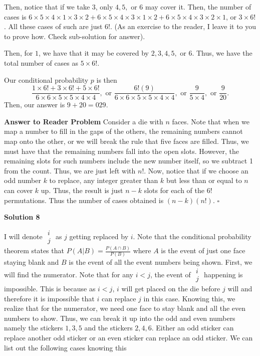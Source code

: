 \begin{enumerate}
 Then, notice that if we take \( 3 \), only \( 4, 5, \) or \( 6 \) may cover it. Then, the number of cases is \( 6 \times 5 \times 4 \times 1 \times 3 \times 2 + 6 \times 5 \times 4 \times 3 \times 1 \times 2 + 6 \times 5 \times 4 \times 3 \times 2 \times 1 \), or \( 3 \times 6! \). All these cases of such are just \( 6! \). (As an exercise to the reader, I leave it to you to prove how. Check sub-solution for answer).

 Then, for \( 1 \), we have that it may be covered by \( 2, 3, 4, 5, \) or \( 6 \). Thus, we have the total number of cases as \( 5 \times 6! \).

 Our conditional probability \( p \) is then 
 \[\frac{1 \times 6! + 3 \times 6! + 5 \times 6!}{6 \times 6 \times 5 \times 5 \times 4 \times 4}, \text{ or } \frac{6!(9)}{6 \times 6 \times 5 \times 5 \times 4 \times 4}, \text{ or } \frac{9}{5 \times 4}, \text{ or } \frac{9}{20}.\]Then, our answer is \( 9+20 = \boxed{029} \).

 \textbf{Answer to Reader Problem} Consider a die with \( n \) faces. Note that when we map a number to fill in the gaps of the others, the remaining numbers cannot map onto the other, or we will break the rule that five faces are filled. Thus, we must have that the remaining numbers fall into the open slots. However, the remaining slots for such numbers include the new number itself, so we subtract 1 from the count. Thus, we are just left with \( n! \). Now, notice that if we choose an odd number \( k \) to replace, any integer greater than \( k \) but less than or equal to \( n \) can cover \( k \) up. Thus, the result is just \( n - k \) slots for each of the \( 6! \) permutations. Thus the number of cases obtained is \( (n - k)(n!) \). $\square$




\textbf{Solution 8}

I will denote $\substack{\textstyle i \\ \textstyle j}$ as $j$ getting replaced by $i$. Note that the conditional probability theorem states that $P(A|B) = \frac{P(A \cap B)}{P(B)}$ where $A$ is the event of just one face staying blank and $B$ is the event of all the event numbers being shown. First, we will find the numerator. Note that for any $i < j$, the event of $\substack{\textstyle i \\ \textstyle j}$ happening is impossible. This is because as $i < j$, $i$ will get placed on the die before $j$ will and therefore it is impossible that $i$ can replace $j$ in this case. Knowing this, we realize that for the numerator, we need one face to stay blank and all the even numbers to show. Thus, we can break it up into the odd and even numbers namely the stickers $1, 3, 5$ and the stickers $2, 4, 6$. Either an odd sticker can replace another odd sticker or an even sticker can replace an odd sticker. We can list out the following cases knowing this


\end{enumerate}
